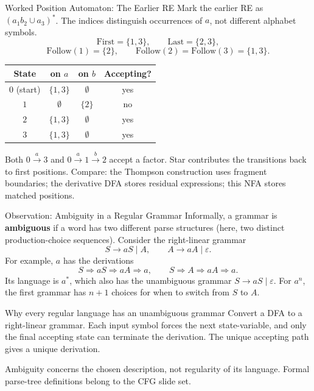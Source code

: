\documentclass[10pt]{beamer}
\begin{document}
\begin{frame}{Worked Position Automaton: The Earlier RE}
  \small
  Mark the earlier RE as $(a_1b_2\cup a_3)^*$. The indices distinguish
  occurrences of $a$, not different alphabet symbols.
  \[
    \mathrm{First}=\{1,3\},\qquad \mathrm{Last}=\{2,3\},
  \]
  \[
    \mathrm{Follow}(1)=\{2\},\qquad
    \mathrm{Follow}(2)=\mathrm{Follow}(3)=\{1,3\}.
  \]
  \pause
  \begin{center}
    \begin{tabular}{c|cc|c}
      State & on $a$ & on $b$ & Accepting? \\
      \hline
      $0$ (start) & $\{1,3\}$ & $\emptyset$ & yes \\
      $1$ & $\emptyset$ & $\{2\}$ & no \\
      $2$ & $\{1,3\}$ & $\emptyset$ & yes \\
      $3$ & $\{1,3\}$ & $\emptyset$ & yes
    \end{tabular}
  \end{center}
  \pause
  Both $0\xrightarrow{a}3$ and $0\xrightarrow{a}1\xrightarrow{b}2$
  accept a factor. Star contributes the transitions back to first positions.
  Compare: the Thompson construction uses fragment boundaries; the derivative
  DFA stores residual expressions; this NFA stores matched positions.
\end{frame}

\begin{frame}{Observation: Ambiguity in a Regular Grammar}
  \small
  Informally, a grammar is \textbf{ambiguous} if a word has two different
  parse structures (here, two distinct production-choice sequences).
  Consider the right-linear grammar
  \[
    S\to aS\mid A,\qquad A\to aA\mid\varepsilon.
  \]
  For example, $a$ has the derivations
  \[
    S\Rightarrow aS\Rightarrow aA\Rightarrow a,
    \qquad S\Rightarrow A\Rightarrow aA\Rightarrow a.
  \]
  \pause
  Its language is $a^*$, which also has the unambiguous grammar
  $S\to aS\mid\varepsilon$. For $a^n$, the first grammar has $n+1$
  choices for when to switch from $S$ to $A$.
  \begin{block}{Why every regular language has an unambiguous grammar}
    Convert a DFA to a right-linear grammar. Each input symbol forces the
    next state-variable, and only the final accepting state can terminate
    the derivation. The unique accepting path gives a unique derivation.
  \end{block}
  Ambiguity concerns the chosen description, not regularity of its language.
  Formal parse-tree definitions belong to the CFG slide set.
\end{frame}
\end{document}
